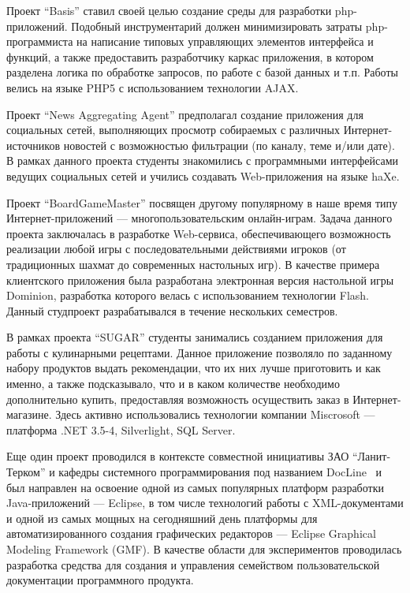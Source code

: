 \documentclass[a4paper]{article}
\begin{document}
Проект ``Basis'' ставил своей целью создание среды для разработки php-приложений. Подобный инструментарий должен минимизировать затраты php-программиста на написание типовых управляющих элементов интерфейса и функций, а также предоставить разработчику каркас приложения, в котором разделена логика по обработке запросов, по работе с базой данных и т.п. Работы велись на языке PHP5 с использованием технологии AJAX.

Проект ``News Aggregating Agent'' предполагал создание приложения для социальных сетей, выполняющих просмотр собираемых с различных Интернет-источников новостей с возможностью фильтрации (по каналу, теме и/или дате). В рамках данного проекта студенты знакомились с программными интерфейсами ведущих социальных сетей и учились создавать Web-приложения на языке haXe.

Проект ``BoardGameMaster'' посвящен другому популярному в наше время типу Интернет-приложений --- многопользовательским онлайн-играм. Задача данного проекта заключалась в разработке Web-сервиса, обеспечивающего возможность реализации любой игры с последовательными действиями игроков (от традиционных шахмат до современных настольных игр). В качестве примера клиентского приложения была разработана электронная версия настольной игры Dominion, разработка которого велась с использованием технологии Flash. Данный студпроект разрабатывался  в течение нескольких семестров.

В рамках проекта ``SUGAR'' студенты занимались созданием приложения для работы с кулинарными рецептами. Данное приложение позволяло по заданному набору продуктов выдать рекомендации, что их них лучше приготовить и как именно, а также подсказывало, что и в каком количестве необходимо дополнительно купить, предоставляя возможность осуществить заказ в Интернет-магазине. Здесь активно использовались технологии компании Miscrosoft --- платформа .NET 3.5-4, Silverlight, SQL Server.

Еще один проект проводился в контексте совместной инициативы ЗАО ``Ланит-Терком'' и кафедры системного программирования под названием DocLine~\cite{docLine1, docLine2, docLine3} и был направлен на освоение одной из самых популярных платформ разработки Java-приложений --- Eclipse, в том числе технологий работы с XML-документами и одной из самых мощных на сегодняшний день платформы для автоматизированного создания графических редакторов --- Eclipse Graphical Modeling Framework (GMF). В качестве области для экспериментов проводилась разработка средства для создания и управления семейством пользовательской документации программного продукта. 
 
\end{document}
